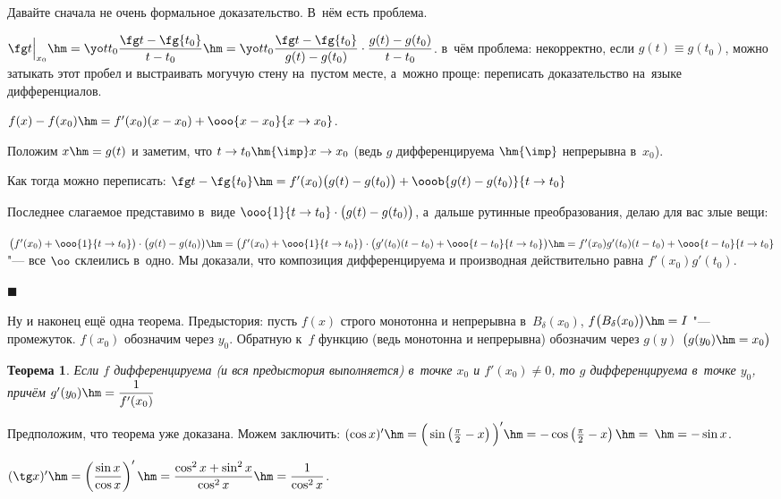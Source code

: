 \documentclass[a4paper,10pt,twoside]{article}
\newtheorem{The}{Теорема}[section]
\newenvironment{Proof}
       {\par\noindent{\textbf{Доказательство.}}}
       {\hfill$\scriptstyle\blacksquare$}
\begin{document}
\begin{Proof}
    Давайте сначала не очень формальное доказательство. В~нём есть проблема.

    $\fg t\Big|_{x_0}\hm=\yo t{t_0}\dfrac{\fg t-\fg{t_0}}{t-t_0}\hm=\yo t{t_0}\dfrac{\fg t-\fg{t_0}}{g(t)-g(t_0)}\cdot \dfrac{g(t)-g(t_0)}{t-t_0}$.
    в~чём проблема: некорректно, если $g(t)\equiv g(t_0)$, можно затыкать этот пробел и выстраивать могучую стену на~пустом месте,
    а~можно проще: переписать доказательство на~языке дифференциалов.

    $f(x)-f(x_0)\hm=f'(x_0)(x-x_0)+\ooo{x-x_0}{x\to x_0}$.

    Положим $x\hm=g(t)$ и заметим, что $t\to t_0\hm{\imp} x\to x_0$ (ведь $g$ дифференцируема $\hm{\imp}$
    непрерывна в~$x_0$).

    Как тогда можно переписать: $\fg t-\fg{t_0}\hm=f'(x_0)\big(g(t)-g(t_0)\big)+\ooob{g(t)-g(t_0)}{t\to t_0}$

    Последнее слагаемое
    представимо в~виде $\ooo{1}{t\to t_0}\cdot\big(g(t)-g(t_0)\big)$, а~дальше рутинные преобразования, делаю для вас злые вещи:

    $\big(f'(x_0)+\ooo{1}{t\to t_0}\big)\cdot\big(g(t)-g(t_0)\big)\hm=\big(f'(x_0)+\ooo{1}{t\to t_0}\big)\cdot\big(g'(t_0)(t-t_0)+\ooo{t-t_0}{t\to t_0}\big)\hm=
    f'(x_0)g'(t_0)(t-t_0)+\ooo{t-t_0}{t\to t_0}$ "--- все $\oo$ склеились в~одно. Мы доказали, что композиция дифференцируема и производная действительно равна $f'(x_0)g'(t_0)$.

\end{Proof}

Ну и наконец ещё одна теорема. Предыстория: пусть $f(x)$ строго монотонна и непрерывна в~$B_\delta(x_0)$, $f\big(B_\delta(x_0)\big)\hm=I$ "--- промежуток. $f(x_0)$ обозначим через $y_0$. Обратную к~$f$ функцию (ведь монотонна и непрерывна) обозначим через $g(y)$ $\big(g(y_0)\hm=x_0\big)$

\begin{The}\label{prob}
    Если $f$ дифференцируема (и вся предыстория выполняется) в~точке $x_0$ и $f'(x_0)\neq 0$, то $g$ дифференцируема в~точке $y_0$, причём $g'(y_0)\hm=\dfrac1{f'(x_0)}$
\end{The}

Предположим, что теорема уже доказана. Можем заключить: $(\cos x)'\hm=\Big(\sin\left(\frac{\pi}2-x\right)\Big)'\hm=-\cos\left(\frac{\pi}2-x\right)\hm=$ $\hm=-\sin x$.

$(\tg x)'\hm=\left(\dfrac{\sin x}{\cos x}\right)'\hm=\dfrac{\cos^2x+\sin^2x}{\cos^2x}\hm=\dfrac1{\cos^2x}$.
\end{document}
